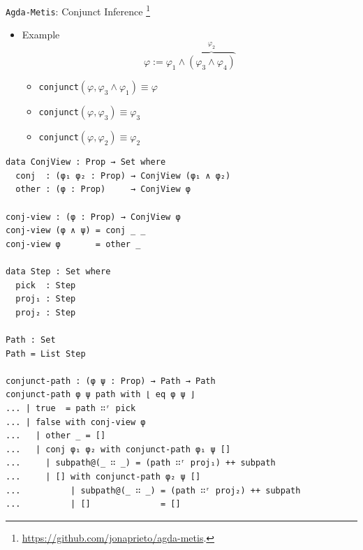 \documentclass[10pt, xetex, hyperref={pdfpagelabels=false}]{beamer}
\begin{document}
\begin{frame}[fragile, label=atp-conjunct]{\texttt{Agda-Metis}: Conjunct Inference
  \footnote{\url{https://github.com/jonaprieto/agda-metis}.}
  }
\begin{itemize}
\begin{center}
\begin{columns}
\begin{column}{0.2\textwidth}
\end{column}
\end{columns}
\end{center}
\vskip 2mm

\item Example
\[ \varphi := \varphi_1 ∧ \overbrace{(\varphi_3 ∧ \varphi_4)}^{\varphi_2}\]

\begin{itemize}

\item
\texttt{conjunct}$(\varphi , \varphi_3 ∧ \varphi_1) ≡ \varphi$
\vskip 3mm
\item
\texttt{conjunct}$(\varphi , \varphi_3)      ≡ \varphi_3$
\vskip 3mm
\item
\texttt{conjunct}$(\varphi , \varphi_2)      ≡ \varphi_2$
\vskip 3mm
\end{itemize}

\end{itemize}
\end{frame}

\begin{frame}[fragile]

\begin{verbatim}
data ConjView : Prop → Set where
  conj  : (φ₁ φ₂ : Prop) → ConjView (φ₁ ∧ φ₂)
  other : (φ : Prop)     → ConjView φ

conj-view : (φ : Prop) → ConjView φ
conj-view (φ ∧ ψ) = conj _ _
conj-view φ       = other _

data Step : Set where
  pick  : Step
  proj₁ : Step
  proj₂ : Step

Path : Set
Path = List Step

conjunct-path : (φ ψ : Prop) → Path → Path
conjunct-path φ ψ path with ⌊ eq φ ψ ⌋
... | true  = path ∷ʳ pick
... | false with conj-view φ
...   | other _ = []
...   | conj φ₁ φ₂ with conjunct-path φ₁ ψ []
...     | subpath@(_ ∷ _) = (path ∷ʳ proj₁) ++ subpath
...     | [] with conjunct-path φ₂ ψ []
...          | subpath@(_ ∷ _) = (path ∷ʳ proj₂) ++ subpath
...          | []              = []
\end{verbatim}

\end{frame}
\end{document}
